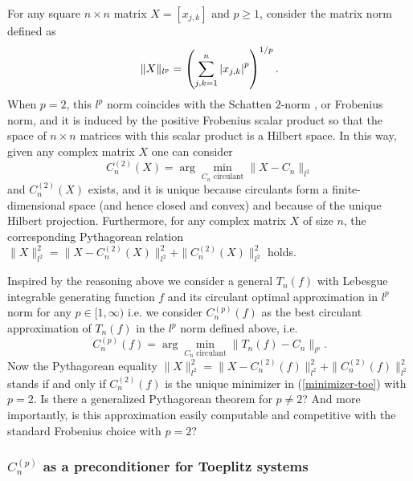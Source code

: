 \documentclass{article}
\begin{document}
 For any square $n \times n$ matrix $ X = \left[ x_{ j, k } \right] $ and $ p \geq 1 $, consider the matrix norm defined as
\begin{equation}\label{lp-norm}
	\| X \|_{ l^{ p } } = \left( \sum_{ j, k = 1 }^{ n } \abs{ x_{ j, k } }^{ p } \right)^{ 1 / p }.
\end{equation}
When $p=2$, this $l^p$ norm coincides with the Schatten $2$-norm \cite{Bhatia}, or Frobenius norm, and it is induced by the positive Frobenius scalar product so that the space of $n\times n$ matrices with this scalar product is a Hilbert space. In this way, given any complex matrix $X$ one can consider
\[
C_{ n }^{ \left( 2 \right) }(X) = \arg \min_{ C_{ n } \text{ circulant} } \| X - C_{ n } \|_{ l^{2} }
\]
and $C_{ n }^{ \left( 2 \right) }(X)$ exists, and it is unique because circulants form a finite-dimensional space (and hence closed and convex) and because of the unique Hilbert projection. Furthermore, for any complex matrix $X$ of size $n$, the corresponding Pythagorean relation
$\|X\|_{ l^{2} }^2=\| X - C_{ n }^{ \left( 2 \right) }(X) \|_{ l^{2} }^2+\|C_{ n }^{ \left( 2 \right) }(X) \|_{ l^{2} }^2$ holds.

Inspired by the reasoning above we consider a general $T_n(f)$ with Lebesgue integrable generating function $f$ and its circulant optimal approximation in $l^p$ norm for any $p\in [1,\infty)$ i.e. we consider $ C_{ n }^{ \left( p \right) }(f)$ as the best circulant approximation of $ T_{ n } \left( f \right) $ in the $ l^{ p } $ norm defined above, i.e.
\begin{equation}\label{minimizer-toe}
	C_{ n }^{ \left( p \right) }(f) = \arg \min_{ C_{ n } \text{ circulant} } \| T_{ n } \left( f \right) - C_{ n } \|_{ l^{ p } }.
\end{equation}
Now the Pythagorean equality $\|X\|_{ l^{2} }^2=\| X - C_{ n }^{ \left( 2 \right) }(f) \|_{ l^{2} }^2+\|C_{ n }^{ \left( 2 \right) }(f) \|_{ l^{2} }^2$ stands if and only if  $C_{ n }^{ \left( 2 \right) }(f)$ is the unique minimizer in (\ref{minimizer-toe}) with $p=2$.
Is there a generalized Pythagorean theorem for $p\neq 2$? And more importantly, is this approximation easily computable and competitive with the standard Frobenius choice with $p=2$?


\subsubsection{$ C_{ n }^{ \left( p \right) } $ as a preconditioner for Toeplitz systems}
\end{document}
